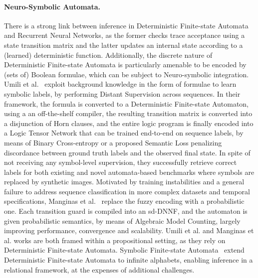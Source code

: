 \paragraph{Neuro-Symbolic Automata.}

There is a strong link between inference in Deterministic Finite-state Automata and Recurrent Neural Networks, as the former checks trace acceptance using a state transition matrix and the latter updates an internal state according to a (learned) deterministic function.
%
Additionally, the discrete nature of Deterministic Finite-state Automata is particularly amenable to be encoded by (sets of) Boolean formulae, which can be subject to Neuro-symbolic integration.
%
Umili et al.~\cite{umili2023grounding} exploit background knowledge in the form of \LTLf formulae to learn symbolic labels, by performing Distant Supervision across sequences.
In their framework, the \LTLf formula is converted to a Deterministic Finite-state Automaton, using a an off-the-shelf compiler, the resulting transition matrix is converted into a disjunction of Horn clauses, %
and the entire logic program is finally encoded into a Logic Tensor Network
that can be trained end-to-end on sequence labels, by means of Binary Cross-entropy or a proposed Semantic Loss penalizing discordance between ground truth labels and the observed final state. %
In spite of not receiving any symbol-level supervision, they successfully retrieve correct labels for both existing and novel automata-based benchmarks where symbols are replaced by synthetic images.
%
Motivated by training instabilities and a general failure to address sequence classification in more complex datasets and temporal specifications, Manginas et al.~\cite{manginas2024nesya} replace the fuzzy encoding with a probabilistic one. Each transition guard is compiled into an sd-DNNF, and the automaton is given probabilistic semantics, by means of Algebraic Model Counting, largely improving performance, convergence and scalability.
Umili et al. and Manginas et al. works are both framed within a propositional setting, as they rely on Deterministic Finite-state Automata. Symbolic Finite-state Automata~\cite{veanes2010symbolic,veanes2013applications,d2017power} extend Deterministic Finite-state Automata to infinite alphabets, enabling inference in a relational framework, at the expenses of additional challenges.